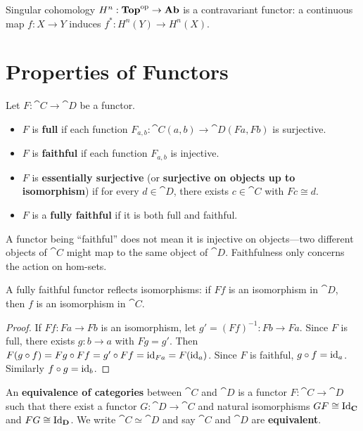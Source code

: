 \begin{example}[Cohomology]
Singular cohomology $H^n: \mathbf{Top}^{\mathrm{op}} \to \mathbf{Ab}$ is a contravariant functor: a continuous map $f: X \to Y$ induces $f^*: H^n(Y) \to H^n(X)$.
\end{example}

\section{Properties of Functors}

\begin{definition}
Let $F: \cat{C} \to \cat{D}$ be a functor.
\begin{itemize}
  \item $F$ is \textbf{full} if each function $F_{a,b}: \cat{C}(a,b) \to \cat{D}(Fa, Fb)$ is surjective.
  \item $F$ is \textbf{faithful} if each function $F_{a,b}$ is injective.
  \item $F$ is \textbf{essentially surjective} (or \textbf{surjective on objects up to isomorphism}) if for every $d \in \cat{D}$, there exists $c \in \cat{C}$ with $Fc \cong d$.
  \item $F$ is a \textbf{fully faithful} if it is both full and faithful.
\end{itemize}
\end{definition}

\begin{remark}
A functor being ``faithful'' does not mean it is injective on objects—two different objects of $\cat{C}$ might map to the same object of $\cat{D}$. Faithfulness only concerns the action on hom-sets.
\end{remark}

\begin{proposition}
A fully faithful functor reflects isomorphisms: if $Ff$ is an isomorphism in $\cat{D}$, then $f$ is an isomorphism in $\cat{C}$.
\end{proposition}

\begin{proof}
If $Ff: Fa \to Fb$ is an isomorphism, let $g' = (Ff)^{-1}: Fb \to Fa$. Since $F$ is full, there exists $g: b \to a$ with $Fg = g'$. Then $F(g \circ f) = Fg \circ Ff = g' \circ Ff = \mathrm{id}_{Fa} = F(\mathrm{id}_a)$. Since $F$ is faithful, $g \circ f = \mathrm{id}_a$. Similarly $f \circ g = \mathrm{id}_b$.
\end{proof}

\begin{definition}
An \textbf{equivalence of categories} between $\cat{C}$ and $\cat{D}$ is a functor $F: \cat{C} \to \cat{D}$ such that there exist a functor $G: \cat{D} \to \cat{C}$ and natural isomorphisms $GF \cong \mathrm{Id}_{\mathbf{C}}$ and $FG \cong \mathrm{Id}_{\mathbf{D}}$. We write $\cat{C} \simeq \cat{D}$ and say $\cat{C}$ and $\cat{D}$ are \textbf{equivalent}.
\end{definition}

